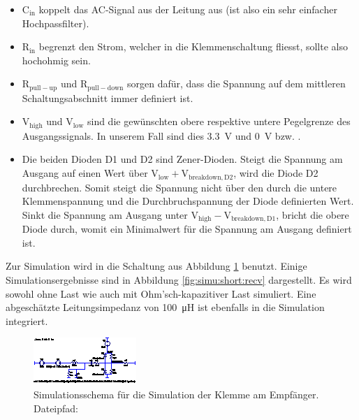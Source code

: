 \begin{itemize}
    \tightlist
    \item
        $\mathrm{C_{in}}$ koppelt das AC-Signal aus  der Leitung aus (ist also
        ein sehr einfacher Hochpassfilter).
    \item
        $\mathrm{R_{in}}$ begrenzt den Strom,  welcher in die Klemmenschaltung
        fliesst, sollte also hochohmig sein.
    \item
        $\mathrm{R_{pull-up}}$  und  $\mathrm{R_{pull-down}}$ sorgen  daf\"ur,
        dass  die   Spannung  auf  dem  mittleren   Schaltungsabschnitt  immer
        definiert ist.
    \item
        $\mathrm{V_{high}}$  und  $\mathrm{V_{low}}$  sind  die  gew\"unschten
        obere  respektive untere  Pegelgrenze des  Ausgangssignals. In unserem
        Fall sind dies \SI{3.3}{\volt} und \SI{0}{\volt} bzw. .
    \item
        Die beiden Dioden D1 und  D2 sind Zener-Dioden. Steigt die Spannung am
        Ausgang auf  einen Wert \"uber $\mathrm{V_{low}  + V_{breakdown,D2}}$,
        wird die Diode D2 durchbrechen. Somit steigt die Spannung nicht \"uber
        den  durch  die  untere  Klemmenspannung  und  die  Durchbruchspannung
        der  Diode  definierten  Wert. Sinkt  die Spannung  am  Ausgang  unter
        $\mathrm{V_{high} - V_{breakdown,D1}}$, bricht  die obere Diode durch,
        womit ein Minimalwert f\"ur die Spannung am Ausgang definiert ist.
\end{itemize}

\clearpage
Zur   Simulation  wird   in     die   Schaltung  aus   Abbildung
\ref{fig:ltspice:shortCircuit:receiver}  benutzt. Einige Simulationsergebnisse
sind in  Abbildung \ref{fig:simu:short:recv} dargestellt. Es wird  sowohl ohne
Last  wie auch  mit  Ohm'sch-kapazitiver  Last simuliert. Eine  abgesch\"atzte
Leitungsimpedanz von  \SI{100}{\micro\henry} ist  ebenfalls in  die Simulation
integriert.

\begin{figure}[h!tb]
    \centering
    \includegraphics[width=\textwidth]{images/ltspice/jac/shortcircuit-recv.eps}
    \caption[-Schema f\"ur Klemmenschaltung]{
        Simulationsschema f\"ur die Simulation  der Klemme am Empf\"anger.\protect\\
        Dateipfad: %
    }
    \label{fig:ltspice:shortCircuit:receiver}
\end{figure}

